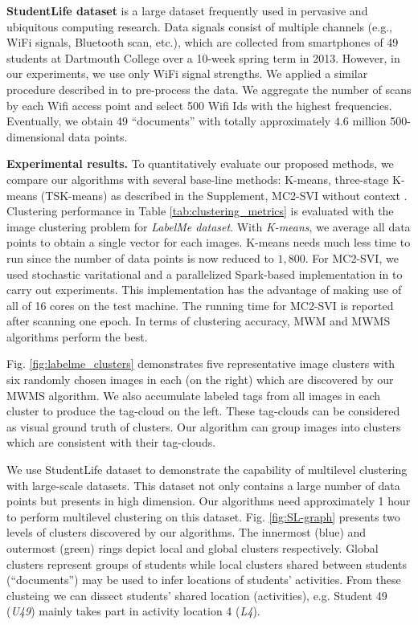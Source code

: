 \textbf{StudentLife dataset} is a large dataset frequently
used in pervasive and ubiquitous computing research. Data signals consist of
multiple channels  (e.g., WiFi signals, Bluetooth scan, etc.), which are
collected from smartphones of 49 students at Dartmouth
College over a 10-week spring term in 2013. However, in our experiments,
we use only WiFi signal strengths. We applied a similar procedure
described in \cite{nguyen_nguyen_venkatesh_phung_icpr16mcnc} to pre-process the
data. We aggregate the number of scans by each Wifi access point and
select 500 Wifi Ids with the highest frequencies. Eventually, we obtain
49 ``documents'' with totally approximately $4.6$ million 500-dimensional
data points.

\textbf{Experimental results.} To quantitatively evaluate our proposed
methods, we compare our algorithms with several base-line methods:
K-means, three-stage K-means (TSK-means) as described in the Supplement, 
MC2-SVI without context \cite{Viet-2016}. Clustering performance in Table
\ref{tab:clustering_metrics} is evaluated with the image clustering
problem for \emph{LabelMe dataset}. With \emph{K-means}, we
average all data points to obtain a single vector for each images.
K-means needs much less time to run since the number of data points
is now reduced to $1,800$. For MC2-SVI, we used stochastic varitational and 
a parallelized Spark-based implementation in \cite{Viet-2016} to carry out 
experiments. This implementation has the advantage of making use of all of 16 cores on the test machine. 
The running time for MC2-SVI is reported after scanning one epoch.
In terms of clustering accuracy, MWM and MWMS algorithms 
perform the best.

Fig. \ref{fig:labelme_clusters} demonstrates five representative
image clusters with six randomly chosen images in each (on the right)
which are discovered by our MWMS algorithm. We also accumulate labeled
tags from all images in each cluster to produce the tag-cloud on the
left. These tag-clouds can be considered as visual ground truth of
clusters. Our algorithm can group images into clusters which are consistent
with their tag-clouds.

We use StudentLife dataset to demonstrate the capability of multilevel
clustering with large-scale datasets. This dataset not only contains
a large number of data points but presents in high dimension. Our
algorithms need approximately 1 hour to perform multilevel
clustering on this dataset. Fig. \ref{fig:SL-graph} presents two
levels of clusters discovered by our algorithms. The innermost (blue)
and outermost (green) rings depict local and global clusters respectively.
Global clusters represent groups of students while local clusters
shared between students (``documents'') may be used to infer
locations of students' activities. From these clusteing we can dissect
students' shared location (activities), e.g. Student 49 (\emph{U49})
mainly takes part in activity location 4 (\emph{L4}). 


